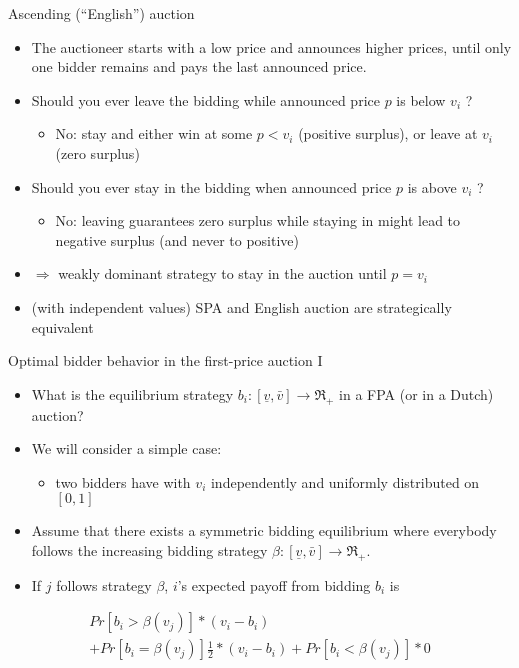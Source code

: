 \documentclass[bigger]{beamer}
\newcommand{\Ra}{\Rightarrow} \newcommand{\ra}{\rightarrow} \newcommand{\Lra}{\Leftrightarrow}
\begin{document}
\begin{frame}[label={sec:org1630fd8}]{Ascending (“English”) auction}
\begin{itemize}
\item The auctioneer starts with a low price and announces higher prices, until only one bidder remains and pays the last announced price.
\item Should you ever leave the bidding while announced price \(p\) is below \(v_i\) ?
\begin{itemize}
\item No: stay and either win at some \(p < v_i\) (positive surplus), or leave at \(v_i\) (zero surplus)
\pause
\end{itemize}
\item Should you ever stay in the bidding when announced price \(p\) is above \(v_i\) ?
\begin{itemize}
\item No: leaving guarantees zero surplus while staying in might lead to negative surplus (and never to positive)
\end{itemize}
\item \(\Ra\) weakly dominant strategy to stay in the auction until \(p = v_i\)
\item (with independent values) SPA and English auction are strategically equivalent
\end{itemize}
\end{frame}

\begin{frame}[label={sec:org8d5e134}]{Optimal bidder behavior in the ﬁrst-price auction I}
\begin{itemize}
\item What is the equilibrium strategy \(b_i:[\underline v,\bar v]\ra\Re_+\) in a FPA (or in a Dutch) auction?
\item We will consider a simple case:
\begin{itemize}
\item two bidders have with \(v_i\) independently and uniformly distributed on \([0, 1]\)
\end{itemize}
\item Assume that there exists a symmetric bidding equilibrium where everybody follows the increasing bidding strategy \(\beta: [\underline v,\bar v]\ra\Re_+\).
\item If \(j\) follows strategy \(\beta\), \(i\)'s expected payoff from bidding \(b_i\) is
\end{itemize}
\begin{multline*}
Pr[b_i>\beta(v_j)]*(v_i-b_i) \\+ Pr[b_i=\beta(v_j)]\frac{1}{2}*(v_i-b_i)+Pr[b_i<\beta(v_j)]*0
\end{multline*}
\end{frame}
\end{document}
